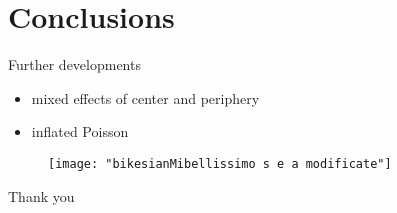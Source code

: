 \documentclass[pdf]{beamer}
\begin{document}
\section{Conclusions}

\begin{frame}{Further developments}
\begin{itemize}
	\item mixed effects of center and periphery
	\item inflated Poisson
\end{itemize}

\end{frame}
\begin{frame}
\begin{figure}
	\centering
	\texttt{[image: "bikesianMibellissimo s e a modificate"]}
	\label{fig:bikesianmibellissimo-s-e-a-modificate}
\end{figure}
\centering Thank you
\end{frame}
\end{document}
